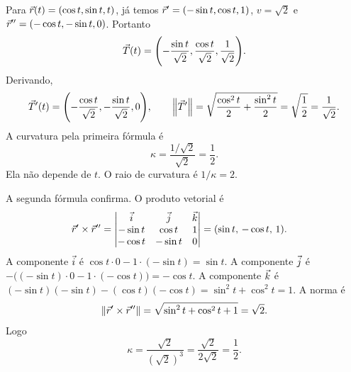 \documentclass[11pt,a4paper]{article}
\begin{document}
\begin{exemplo}
Para \(\vec{r}(t)=(\cos t,\sin t,t)\), já temos \(\vec{r}'=(-\sin t,\cos t,1)\), \(v=\sqrt{2}\) e \(\vec{r}''=(-\cos t,-\sin t,0)\). Portanto
\[
\vec{T}(t)
=\Biggl(-\frac{\sin t}{\sqrt{2}},\frac{\cos t}{\sqrt{2}},\frac{1}{\sqrt{2}}\Biggr).
\]
Derivando,
\[
\vec{T}'(t)
=\Biggl(-\frac{\cos t}{\sqrt{2}},-\frac{\sin t}{\sqrt{2}},0\Biggr),
\qquad
\left\lVert \vec{T}' \right\rVert
=\sqrt{\frac{\cos^{2}t}{2}+\frac{\sin^{2}t}{2}}
=\sqrt{\frac12}
=\frac{1}{\sqrt{2}}.
\]
A curvatura pela primeira fórmula é
\[
\kappa=\frac{1/\sqrt{2}}{\sqrt{2}}=\frac{1}{2}.
\]
Ela não depende de \(t\). O raio de curvatura é \(1/\kappa=2\).

A segunda fórmula confirma. O produto vetorial é
\begin{align*}
\vec{r}'\times\vec{r}''
&=
\begin{vmatrix}
\vec{i}&\vec{j}&\vec{k}\\
-\sin t&\cos t&1\\
-\cos t&-\sin t&0
\end{vmatrix}
=(\sin t,\,-\cos t,\,1).
\end{align*}
A componente \(\vec{i}\) é \(\cos t\cdot 0-1\cdot(-\sin t)=\sin t\). A componente \(\vec{j}\) é \(-\bigl((-\sin t)\cdot 0-1\cdot(-\cos t)\bigr)=-\cos t\). A componente \(\vec{k}\) é \((-\sin t)(-\sin t)-(\cos t)(-\cos t)=\sin^{2}t+\cos^{2}t=1\). A norma é
\[
\left\lVert \vec{r}'\times\vec{r}'' \right\rVert=\sqrt{\sin^{2}t+\cos^{2}t+1}=\sqrt{2}.
\]
Logo
\[
\kappa=\frac{\sqrt{2}}{(\sqrt{2})^{3}}=\frac{\sqrt{2}}{2\sqrt{2}}=\frac12.
\]


\end{exemplo}
\end{document}
